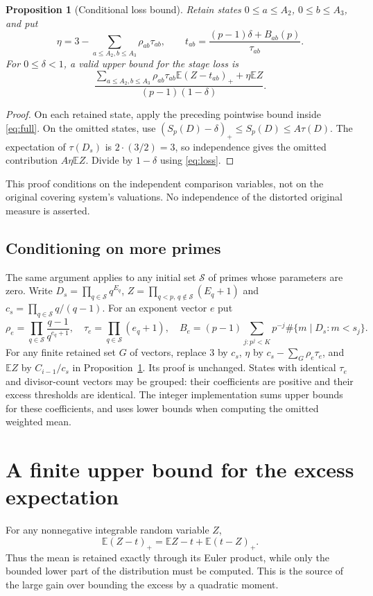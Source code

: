 \documentclass[11pt]{article}
\newtheorem{proposition}[theorem]{Proposition}
\newcommand{\E}{\mathbb E}
\newcommand{\pos}[1]{(#1)_+}
\begin{document}
\begin{proposition}[Conditional loss bound]\label{prop:conditional}
Retain states $0\leq a\leq A_2$, $0\leq b\leq A_3$, and put
\[
 \eta=3-\sum_{a\leq A_2,b\leq A_3}\rho_{ab}\tau_{ab},\qquad
 t_{ab}=\frac{(p-1)\delta+B_{ab}(p)}{\tau_{ab}}.
\]
For $0\leq\delta<1$, a valid upper bound for the stage loss is
\begin{equation}\label{eq:conditional}
 \frac{\displaystyle
  \sum_{a\leq A_2,b\leq A_3}\rho_{ab}\tau_{ab}
                \E\pos{Z-t_{ab}}+\eta\E Z}
 {(p-1)(1-\delta)}.
\end{equation}
\end{proposition}
\begin{proof}
On each retained state, apply the preceding pointwise bound inside
\eqref{eq:full}. On the omitted states, use
$(S_p(D)-\delta)_+\leq S_p(D)\leq A\tau(D)$.
The expectation of $\tau(D_s)$ is $2\cdot(3/2)=3$, so independence gives
the omitted contribution $A\eta\E Z$. Divide by $1-\delta$ using
\eqref{eq:loss}.
\end{proof}

This proof conditions on the independent comparison variables, not on the
original covering system's valuations. No independence of the distorted
original measure is asserted.

\subsection{Conditioning on more primes}
The same argument applies to any initial set $\mathcal S$ of primes whose
parameters are zero. Write $D_s=\prod_{q\in\mathcal S}q^{E_q}$,
$Z=\prod_{q<p,\,q\notin\mathcal S}(E_q+1)$ and
$c_s=\prod_{q\in\mathcal S}q/(q-1)$. For an exponent vector $e$ put
\[
 \rho_e=\prod_{q\in\mathcal S}\frac{q-1}{q^{e_q+1}},\quad
 \tau_e=\prod_{q\in\mathcal S}(e_q+1),\quad
 B_e=(p-1)\sum_{j:p^j<K}p^{-j}\#\{m\mid D_s:m<s_j\}.
\]
For any finite retained set $G$ of vectors, replace $3$ by $c_s$,
$\eta$ by $c_s-\sum_G\rho_e\tau_e$, and $\E Z$ by $C_{i-1}/c_s$
in Proposition~\ref{prop:conditional}. Its proof is unchanged.
States with identical $\tau_e$ and divisor-count vectors may be grouped:
their coefficients are positive and their excess thresholds are identical.
The integer implementation sums upper bounds for these coefficients, and
uses lower bounds when computing the omitted weighted mean.

\section{A finite upper bound for the excess expectation}
For any nonnegative integrable random variable $Z$,
\begin{equation}\label{eq:identity}
 \E\pos{Z-t}=\E Z-t+\E\pos{t-Z}.
\end{equation}
Thus the mean is retained exactly through its Euler product, while only the
bounded lower part of the distribution must be computed. This is the source
of the large gain over bounding the excess by a quadratic moment.
\end{document}
